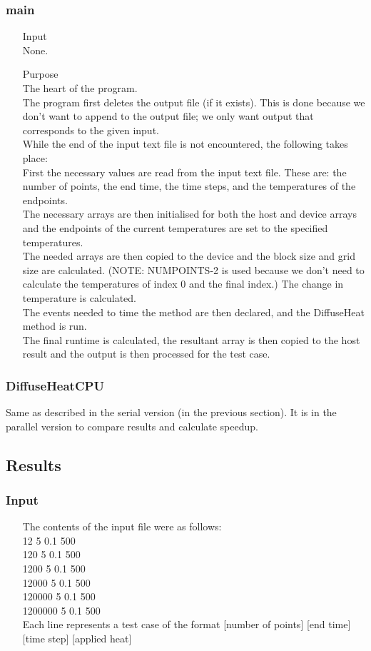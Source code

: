 \documentclass[11pt,a4paper]{article}
\begin{document}
\subsubsection{main}
\begin{itemize}
	\item[Input] \hfill\\
	None.
	\item[Purpose] \hfill\\
	The heart of the program.\\
	The program first deletes the output file (if it exists). This is done because we don't want to append to the output file; we only want output that corresponds to the given input.\\
	While the end of the input text file is not encountered, the following takes place:\\
	First the necessary values are read from the input text file. These are: the number of points, the end time, the time steps, and the temperatures of the endpoints.\\
	The necessary arrays are then initialised for both the host and device arrays and the endpoints of the current temperatures are set to the specified temperatures.\\
	The needed arrays are then copied to the device and the block size and grid size are calculated. (NOTE: NUMPOINTS-2 is used because we don't need to calculate the temperatures of index 0 and the final index.)
	The change in temperature is calculated.\\
	The events needed to time the method are then declared, and the DiffuseHeat method is run.\\
	The final runtime is calculated, the resultant array is then copied to the host result and the output is then processed for the test case.
\end{itemize}

\subsubsection{DiffuseHeatCPU}
Same as described in the serial version (in the previous section). It is in the parallel version to compare results and calculate speedup.

\subsection{Results}
\subsubsection{Input}
\begin{itemize}
	\item[The contents of the input file were as follows:] \hfill\\
	12 5 0.1 500\\
	120 5 0.1 500\\
	1200 5 0.1 500\\
	12000 5 0.1 500\\
	120000 5 0.1 500\\
	1200000 5 0.1 500\\
	Each line represents a test case of the format [number of points] [end time] [time step] [applied heat]
\end{itemize}
\end{document}
